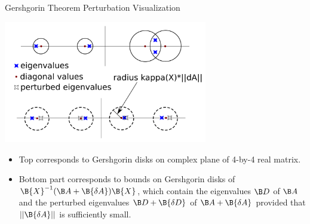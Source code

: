 \begin{frame}{Gershgorin Theorem Perturbation Visualization}

{

\centering

\includegraphics[width=3.5in]{diagrams/gershgorin}

}

\begin{itemize}
\item Top corresponds to Gershgorin disks on complex plane of 4-by-4 real matrix.
\item Bottom part corresponds to bounds on Gershgorin disks of $\B{X}^{-1} (\B A + \B{\delta A}) \B{X}$, which contain the eigenvalues $\B D$ of $\B A$ and the perturbed eigenvalues $\B D +\B{\delta D}$ of $\B A + \B{\delta A}$ provided that $||\B{\delta A}||$ is sufficiently small.
\end{itemize}

\end{frame}

%
%
%

